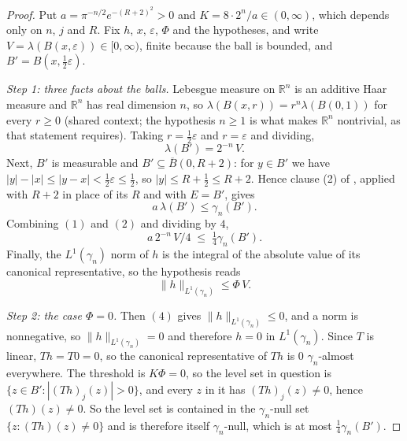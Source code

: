 \begin{proof}
Put $a = \pi^{-n/2}e^{-(R+2)^2} > 0$ and $K = 8\cdot2^n/a \in (0,\infty)$,
which depends only on $n$, $j$ and $R$.  Fix $h$, $x$, $\varepsilon$, $\Phi$
and the hypotheses, and write $V = \lambda(B(x,\varepsilon)) \in [0,\infty)$,
finite because the ball is bounded, and
$B' = B(x,\tfrac12\varepsilon)$.

\emph{Step 1: three facts about the balls.}  Lebesgue measure on
$\mathbb{R}^n$ is an additive Haar measure and $\mathbb{R}^n$ has real
dimension $n$, so $\lambda(B(x,r)) = r^n\lambda(B(0,1))$ for every $r \geq 0$
(shared context; the hypothesis $n \geq 1$ is what makes $\mathbb{R}^n$
nontrivial, as that statement requires).  Taking $r = \tfrac12\varepsilon$ and
$r = \varepsilon$ and dividing,
\begin{equation*}
  \lambda(B') = 2^{-n}\,V . \tag{1}
\end{equation*}
Next, $B'$ is measurable and $B' \subseteq \overline B(0,R+2)$: for $y \in B'$
we have $|y| - |x| \leq |y-x| < \tfrac12\varepsilon \leq \tfrac12$, so
$|y| \leq R + \tfrac12 \leq R+2$.  Hence clause (2) of
, applied with $R+2$ in place of its $R$
and with $E = B'$, gives
\begin{equation*}
  a\,\lambda(B') \leq \gamma_n(B') . \tag{2}
\end{equation*}
Combining $(1)$ and $(2)$ and dividing by $4$,
\begin{equation*}
  a\,2^{-n}\,V/4 \;\leq\; \tfrac14\gamma_n(B') . \tag{3}
\end{equation*}
Finally, the $L^1(\gamma_n)$ norm of $h$ is the integral of the absolute value
of its canonical representative, so the hypothesis reads
\begin{equation*}
  \|h\|_{L^1(\gamma_n)} \leq \Phi\,V . \tag{4}
\end{equation*}

\emph{Step 2: the case $\Phi = 0$.}  Then $(4)$ gives
$\|h\|_{L^1(\gamma_n)} \leq 0$, and a norm is nonnegative, so
$\|h\|_{L^1(\gamma_n)} = 0$ and therefore $h = 0$ in $L^1(\gamma_n)$.  Since
$T$ is linear, $Th = T0 = 0$, so the canonical representative of $Th$ is $0$
$\gamma_n$-almost everywhere.  The threshold is $K\Phi = 0$, so the level set
in question is $\{z \in B' : |(Th)_j(z)| > 0\}$, and every $z$ in it has
$(Th)_j(z) \neq 0$, hence $(Th)(z) \neq 0$.  So the level set is contained in
the $\gamma_n$-null set $\{z : (Th)(z) \neq 0\}$ and is therefore itself
$\gamma_n$-null, which is at most $\tfrac14\gamma_n(B')$.


\end{proof}
